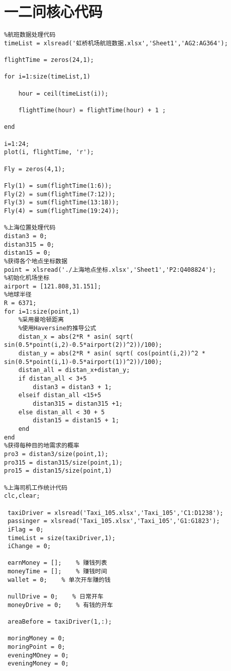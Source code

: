 \documentclass[withoutpreface,bwprint]{cumcmthesis} %
\begin{document}
\section{一二问核心代码}
\begin{lstlisting}
%航班数据处理代码
timeList = xlsread('虹桥机场航班数据.xlsx','Sheet1','AG2:AG364');

flightTime = zeros(24,1);

for i=1:size(timeList,1)
    
    hour = ceil(timeList(i));
    
    flightTime(hour) = flightTime(hour) + 1 ;
    
end

i=1:24;
plot(i, flightTime, 'r');

Fly = zeros(4,1);

Fly(1) = sum(flightTime(1:6));
Fly(2) = sum(flightTime(7:12));
Fly(3) = sum(flightTime(13:18));
Fly(4) = sum(flightTime(19:24));

%上海位置处理代码
distan3 = 0;
distan315 = 0;
distan15 = 0;
%获得各个地点坐标数据
point = xlsread('./上海地点坐标.xlsx','Sheet1','P2:Q408824');
%初始化机场坐标
airport = [121.808,31.151];
%地球半径
R = 6371;
for i=1:size(point,1)
    %采用曼哈顿距离
    %使用Haversine的推导公式
    distan_x = abs(2*R * asin( sqrt( sin(0.5*point(i,2)-0.5*airport(2))^2))/100);
    distan_y = abs(2*R * asin( sqrt( cos(point(i,2))^2 * sin(0.5*point(i,1)-0.5*airport(1))^2))/100);
    distan_all = distan_x+distan_y;  
    if distan_all < 3+5
        distan3 = distan3 + 1;
    elseif distan_all <15+5
        distan315 = distan315 +1;
    else distan_all < 30 + 5 
        distan15 = distan15 + 1;
    end
end
%获得每种目的地需求的概率
pro3 = distan3/size(point,1);
pro315 = distan315/size(point,1);
pro15 = distan15/size(point,1)

%上海司机工作统计代码
clc,clear;
 
 taxiDriver = xlsread('Taxi_105.xlsx','Taxi_105','C1:D1238');
 passinger = xlsread('Taxi_105.xlsx','Taxi_105','G1:G1823');
 iFlag = 0;
 timeList = size(taxiDriver,1);
 iChange = 0;
 
 earnMoney = [];    % 赚钱列表
 moneyTime = [];    % 赚钱时间
 wallet = 0;    % 单次开车赚的钱
 
 nullDrive = 0;    % 日常开车
 moneyDrive = 0;    % 有钱的开车
 
 areaBefore = taxiDriver(1,:);
 
 moringMoney = 0;
 moringPoint = 0;
 eveningMOney = 0;
 eveningMoney = 0;
 

\end{lstlisting}
\end{document}
